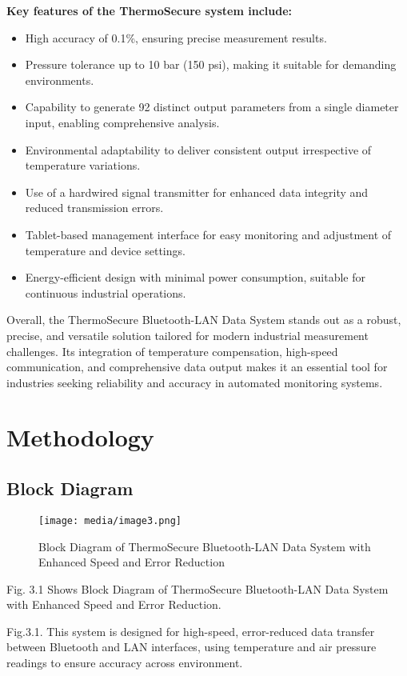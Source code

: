 \documentclass[12pt]{report}
\begin{document}
\begin{flushleft}
\textbf{Key features of the ThermoSecure system include:}
\begin{itemize}[leftmargin=*]
    \item High accuracy of 0.1\%, ensuring precise measurement results.
    \item Pressure tolerance up to 10 bar (150 psi), making it suitable for demanding environments.
    \item Capability to generate 92 distinct output parameters from a single diameter input, enabling comprehensive analysis.
    \item Environmental adaptability to deliver consistent output irrespective of temperature variations.
    \item Use of a hardwired signal transmitter for enhanced data integrity and reduced transmission errors.
    \item Tablet-based management interface for easy monitoring and adjustment of temperature and device settings.
    \item Energy-efficient design with minimal power consumption, suitable for continuous industrial operations.
\end{itemize}

Overall, the ThermoSecure Bluetooth-LAN Data System stands out as a robust, precise, and versatile solution tailored for modern industrial measurement challenges. Its integration of temperature compensation, high-speed communication, and comprehensive data output makes it an essential tool for industries seeking reliability and accuracy in automated monitoring systems.
\end{flushleft}


\chapter{Methodology}
\section{Block Diagram}
\begin{figure}[ht]
    \centering
    \texttt{[image: media/image3.png]}
    \caption{Block Diagram of ThermoSecure Bluetooth-LAN Data System with Enhanced Speed and Error Reduction}
    \label{fig:block_diagram_methodology}
\end{figure}
\begin{flushleft}
Fig. 3.1 Shows Block Diagram of ThermoSecure Bluetooth-LAN Data System with Enhanced Speed and Error Reduction.

Fig.3.1. This system is designed for high-speed, error-reduced data transfer between Bluetooth and LAN interfaces, using temperature and air pressure readings to ensure accuracy across environment.
\end{flushleft}
\end{document}
